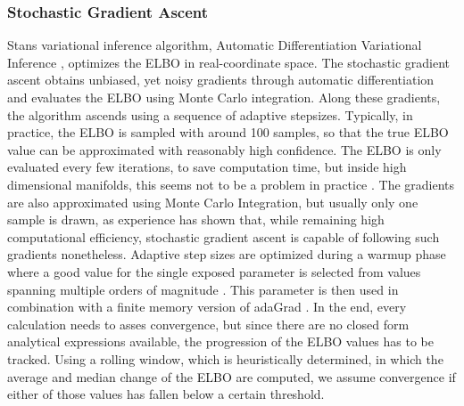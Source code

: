 \subsubsection{Stochastic Gradient Ascent}
\label{sec:stochastic_gradient_ascent}
Stans variational inference algorithm, Automatic Differentiation Variational Inference \cite{Kucukelbir_2015}, optimizes the ELBO in real-coordinate space. The stochastic gradient ascent obtains unbiased, yet noisy gradients through automatic differentiation and evaluates the ELBO using Monte Carlo integration. Along these gradients, the algorithm ascends using a sequence of adaptive stepsizes. Typically, in practice, the ELBO is sampled with around 100 samples, so that the true ELBO value can be approximated with reasonably high confidence. The ELBO is only evaluated every few iterations, to save computation time, but inside high dimensional manifolds, this seems not to be a problem in practice \cite{stan_manual}. The gradients are also approximated using Monte Carlo Integration, but usually only one sample is drawn, as experience has shown that, while remaining high computational efficiency, stochastic gradient ascent is capable of following such gradients nonetheless. Adaptive step sizes are optimized during a warmup phase where a good value for the single exposed parameter is selected from values spanning multiple orders of magnitude \cite{stan_manual}. This parameter is then used in combination with a finite memory version of adaGrad \cite{Duchi_2011}. In the end, every calculation needs to asses convergence, but since there are no closed form analytical expressions available, the progression of the ELBO values has to be tracked. Using a rolling window, which is heuristically determined, in which the average and median change of the ELBO are computed, we assume convergence if either of those values has fallen below a certain threshold. 